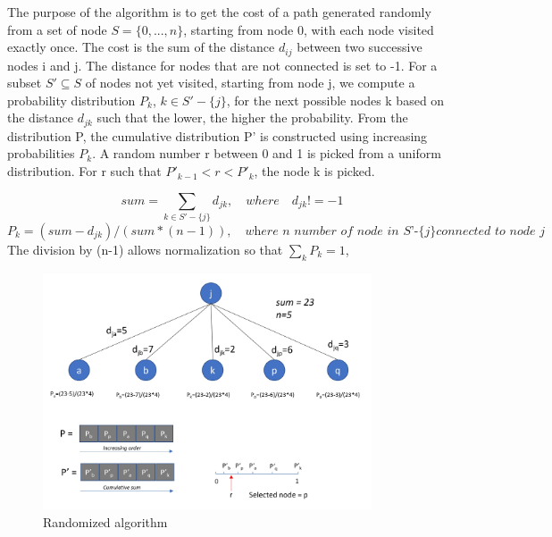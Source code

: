 \documentclass[../report.tex]{subfiles}
\begin{document}
The purpose of the algorithm is to get the cost of a path generated randomly from a set of node $S=\{0,...,n\}$, starting from node 0, with each node visited exactly once. The cost is the sum of the distance $d_{ij}$ between two successive nodes i and j. The distance for nodes that are not connected is set to -1.
\newline{} 
For a subset $S'\subseteq S$ of nodes not yet visited, starting from node j, we compute a probability distribution $P_{k}$, $k \in S'-\{j\}$, for the next possible nodes k based on the distance $d_{jk}$ such that the lower, the higher the probability. From the distribution P, the cumulative distribution P' is constructed using increasing probabilities $P_{k}$.  A random number r between 0 and 1 is picked from a uniform distribution. For r such that $P'_{k-1}< r <P'_{k}$, the node k is picked.


\[ sum = \sum_{k \in S'-\{j\}} d_{jk}, \quad {where} \quad d_{jk}!=-1 \]   
\[ P_{k} = (sum - d_{jk})/(sum*(n-1)), \quad \textit{where n number of node in S'-\{j\} connected to node j}\]
The division by (n-1) allows normalization so that $\sum_{k} P_{k}=1$,

\begin{figure}[ht]
\centering
\includegraphics[height=7cm]{./Images/random_algo.jpg}
\caption{Randomized algorithm \label{overflow}}
\end{figure}
\end{document}
